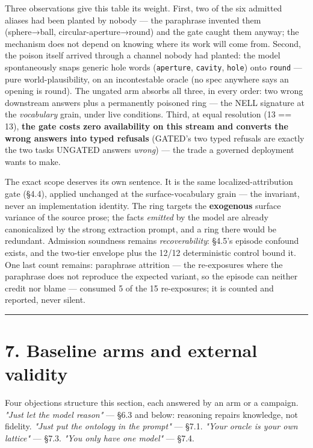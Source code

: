 \documentclass[11pt]{article}
\begin{document}
Three observations give this table its weight. First, two of the six admitted aliases had been planted by nobody — the paraphrase invented them (sphere→ball, circular-aperture→round) and the gate caught them anyway; the mechanism does not depend on knowing where its work will come from. Second, the poison itself arrived through a channel nobody had planted: the model spontaneously snaps generic hole words (\texttt{aperture}, \texttt{cavity}, \texttt{hole}) onto \texttt{round} — pure world-plausibility, on an incontestable oracle (no spec anywhere says an opening is round). The ungated arm absorbs all three, in every order: two wrong downstream answers plus a permanently poisoned ring — the NELL signature at the \emph{vocabulary} grain, under live conditions. Third, at equal resolution (13 == 13), \textbf{the gate costs zero availability on this stream and converts the wrong answers into typed refusals} (GATED's two typed refusals are exactly the two tasks UNGATED answers \emph{wrong}) — the trade a governed deployment wants to make.

The exact scope deserves its own sentence. It is the same localized-attribution gate (§4.4), applied unchanged at the surface-vocabulary grain — the invariant, never an implementation identity. The ring targets the \textbf{exogenous} surface variance of the source prose; the facts \emph{emitted} by the model are already canonicalized by the strong extraction prompt, and a ring there would be redundant. Admission soundness remains \emph{recoverability}: §4.5's episode confound exists, and the two-tier envelope plus the 12/12 deterministic control bound it. One last count remains: paraphrase attrition — the re-exposures where the paraphrase does not reproduce the expected variant, so the episode can neither credit nor blame — consumed 5 of the 15 re-exposures; it is counted and reported, never silent.

\medskip\hrule\medskip

\section*{7. Baseline arms and external validity}

Four objections structure this section, each answered by an arm or a campaign. \emph{"Just let the model reason"} — §6.3 and below: reasoning repairs knowledge, not fidelity. \emph{"Just put the ontology in the prompt"} — §7.1. \emph{"Your oracle is your own lattice"} — §7.3. \emph{"You only have one model"} — §7.4.
\end{document}
